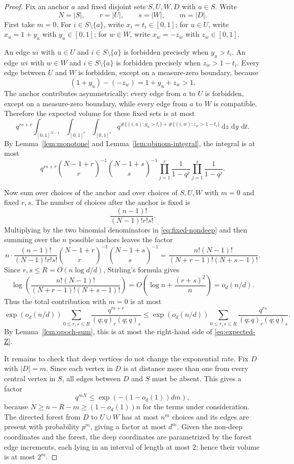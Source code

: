 \documentclass[11pt]{article}
\theoremstyle{definition}
\newcommand{\dd}{\,\mathrm{d}}
\begin{document}
\begin{proof}
Fix an anchor $a$ and fixed disjoint sets $S,U,W,D$ with $a\in S$.  Write
\[
  N=|S|,
  \qquad r=|U|,
  \qquad s=|W|,
  \qquad m=|D|.
\]
First take $m=0$.  For $i\in S\setminus\{a\}$, write $x_i=t_i\in[0,1]$; for $u\in U$, write $x_u=1+y_u$ with $y_u\in[0,1]$; for $w\in W$, write $x_w=-z_w$ with $z_w\in[0,1]$.

\bigskip
\noindent
An edge $ui$ with $u\in U$ and $i\in S\setminus\{a\}$ is forbidden precisely when $y_u>t_i$.  An edge $wi$ with $w\in W$ and $i\in S\setminus\{a\}$ is forbidden precisely when $z_w>1-t_i$.  Every edge between $U$ and $W$ is forbidden, except on a measure-zero boundary, because
\[
  (1+y_u)-(-z_w)=1+y_u+z_w>1.
\]
The anchor contributes asymmetrically: every edge from $a$ to $U$ is forbidden, except on a measure-zero boundary, while every edge from $a$ to $W$ is compatible.  Therefore the expected volume for these fixed sets is at most
\[
  q^{rs+r}\int_{[0,1]^{N-1}}\int_{[0,1]^r}\int_{[0,1]^s}
  q^{\#\{(i,u):y_u>t_i\}+\#\{(i,w):z_w>1-t_i\}}
  \dd z\,\dd y\,\dd t.
\]
By Lemma~\ref{lem:monotone} and Lemma~\ref{lem:qbinom-integral}, the integral is at most
\begin{equation}\label{eq:fixed-nondeep}
  q^{rs+r}
  \binom{N-1+r}{r}^{-1}\binom{N-1+s}{s}^{-1}
  \prod_{j=1}^r\frac1{1-q^j}
  \prod_{j=1}^s\frac1{1-q^j}.
\end{equation}

\smallskip
\noindent
Now sum over choices of the anchor and over choices of $S,U,W$ with $m=0$ and fixed $r,s$.  The number of choices after the anchor is fixed is
\[
  \frac{(n-1)!}{(N-1)!r!s!}.
\]
Multiplying by the two binomial denominators in \eqref{eq:fixed-nondeep} and then summing over the $n$ possible anchors leaves the factor
\[
  n\cdot\frac{(n-1)!}{(N-1)!r!s!}
  \binom{N-1+r}{r}^{-1}\binom{N-1+s}{s}^{-1}
  =\frac{n!(N-1)!}{(N+r-1)!(N+s-1)!}.
\]
Since $r,s\le R=O(n\log d/d)$, Stirling's formula gives
\[
  \log\left(\frac{n!(N-1)!}{(N+r-1)!(N+s-1)!}\right)
  =O\left(\log n+\frac{(r+s)^2}{n}\right)=o_d(n/d).
\]
Thus the total contribution with $m=0$ is at most
\begin{equation}\label{eq:m0-bound}
  \exp(o_d(n/d))
  \sum_{0\le r,s\le R}\frac{q^{rs+r}}{(q;q)_r(q;q)_s}
  \le
  \exp(o_d(n/d))
  \sum_{0\le r,s\le R}\frac{q^{rs}}{(q;q)_r(q;q)_s}.
\end{equation}
By Lemma~\ref{lem:qpoch-sum}, this is at most the right-hand side of \eqref{eq:expected-Z}.

\bigskip
\noindent
It remains to check that deep vertices do not change the exponential rate.  Fix $D$ with $|D|=m$.  Since each vertex in $D$ is at distance more than one from every central vertex in $S$, all edges between $D$ and $S$ must be absent.  This gives a factor
\[
  q^{mN}\le \exp(-(1-o_d(1))dm),
\]
because $N\ge n-R-m\ge(1-o_d(1))n$ for the terms under consideration.  The directed forest from $D$ to $U\cup W$ has at most $n^m$ choices and its edges are present with probability $p^m$, giving a factor at most $d^m$.  Given the non-deep coordinates and the forest, the deep coordinates are parametrized by the forest edge increments, each lying in an interval of length at most $2$; hence their volume is at most $2^m$.


\end{proof}
\end{document}
